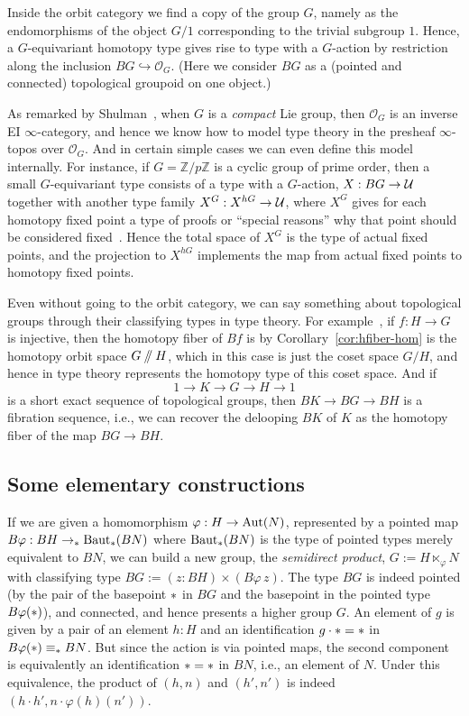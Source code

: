 Inside the orbit category we find a copy of the group $G$, namely as
the endomorphisms of the object $G/1$ corresponding to the trivial
subgroup $1$. Hence, a $G$-equivariant homotopy type gives rise to
type with a $G$-action by restriction along the inclusion $BG
\hookrightarrow \mathcal{O}_G$. (Here we consider $BG$ as a (pointed
and connected) topological groupoid on one object.)

As remarked by Shulman~\cite{shulman:inverseEI}, when $G$ is a \emph{compact} Lie
group, then $\mathcal{O}_G$ is an inverse EI $\infty$-category, and
hence we know how to model type theory in the presheaf $\infty$-topos
over $\mathcal{O}_G$. And in certain simple cases we can even define
this model internally. For instance, if $G=\mathbb{Z}/p\mathbb{Z}$ is a cyclic group
of prime order, then a small $G$-equivariant type consists of a type with a
$G$-action, $X : BG \to \mathcal{U}$ together with another type family $X^G : X^{hG}
\to \mathcal{U}$, where $X^G$ gives for each homotopy fixed point a type of
proofs or ``special reasons'' why that point should be considered
fixed~\cite[7.6]{shulman:inverseEI}. Hence the total space of $X^G$ is the
type of actual fixed points,
and the projection to $X^{hG}$ implements the map from actual fixed
points to homotopy fixed points.

Even without going to the orbit category, we can say something about
topological groups through their classifying types in type theory. For
example~\cite{Camarena}, if $f : H \to G$ is injective, then the
homotopy fiber of $Bf$ is by Corollary~\ref{cor:hfiber-hom}
is the homotopy orbit space $G \mathbin{/\kern-3pt/} H$, which in this case is
just the coset space $G/H$, and hence in type
theory represents the homotopy type of this coset space. And if
\[
  1 \to K \to G \to H \to 1
\]
is a short exact sequence of topological groups,
then $BK \to BG \to BH$ is a fibration sequence,
i.e., we can recover the delooping $BK$ of $K$ as the homotopy fiber
of the map $BG \to BH$.

\subsection{Some elementary constructions}
\label{sec:elementary-constructions}

If we are given a homomorphism $\varphi : H \to \operatorname{Aut}(N)$, represented
by a pointed map
$B\varphi : BH \to_\ast \operatorname{Baut}_\ast(BN)$ where $\operatorname{Baut}_\ast(BN)$ is the
type of pointed types merely equivalent to $BN$,
we can build a new group, the
\emph{semidirect product}, $G := H \ltimes_\varphi N$
with classifying type $BG := (z : BH) \times (B\varphi\,z)$.
The type $BG$ is indeed pointed (by the pair of the basepoint $\ast$ in $BG$
and the basepoint in the pointed type $B\varphi(\ast)$), and
connected, and hence presents a higher group $G$.
An element of $g$ is given by a pair of an element $h : H$ and an
identification $g\cdot\ast = \ast$ in $B\varphi(\ast) \equiv_\ast BN$. But
since the action is via pointed maps, the second component is
equivalently an identification $\ast = \ast$ in $BN$, i.e., an element of
$N$. Under this equivalence, the product of $(h,n)$ and $(h',n')$ is
indeed $(h\cdot h', n\cdot \varphi(h)(n'))$.

